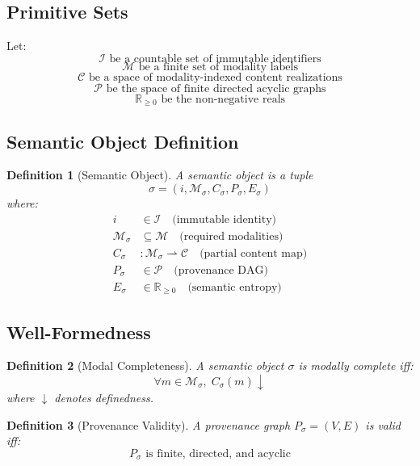 \documentclass[11pt]{article}
\newtheorem{definition}{Definition}
\begin{document}
\subsection{Primitive Sets}

Let:
\[
\mathcal{I} \text{ be a countable set of immutable identifiers}
\]
\[
\mathcal{M} \text{ be a finite set of modality labels}
\]
\[
\mathcal{C} \text{ be a space of modality-indexed content realizations}
\]
\[
\mathcal{P} \text{ be the space of finite directed acyclic graphs}
\]
\[
\mathbb{R}_{\ge 0} \text{ be the non-negative reals}
\]

\subsection{Semantic Object Definition}

\begin{definition}[Semantic Object]
A semantic object is a tuple
\[
\sigma = (i, \mathcal{M}_\sigma, C_\sigma, P_\sigma, E_\sigma)
\]
where:
\begin{align*}
i &\in \mathcal{I} \quad \text{(immutable identity)} \\
\mathcal{M}_\sigma &\subseteq \mathcal{M} \quad \text{(required modalities)} \\
C_\sigma &: \mathcal{M}_\sigma \rightharpoonup \mathcal{C} \quad \text{(partial content map)} \\
P_\sigma &\in \mathcal{P} \quad \text{(provenance DAG)} \\
E_\sigma &\in \mathbb{R}_{\ge 0} \quad \text{(semantic entropy)}
\end{align*}
\end{definition}

\subsection{Well-Formedness}

\begin{definition}[Modal Completeness]
A semantic object $\sigma$ is modally complete iff:
\[
\forall m \in \mathcal{M}_\sigma,\; C_\sigma(m) \downarrow
\]
where $\downarrow$ denotes definedness.
\end{definition}

\begin{definition}[Provenance Validity]
A provenance graph $P_\sigma = (V,E)$ is valid iff:
\[
\text{$P_\sigma$ is finite, directed, and acyclic}
\]
\end{definition}
\end{document}
